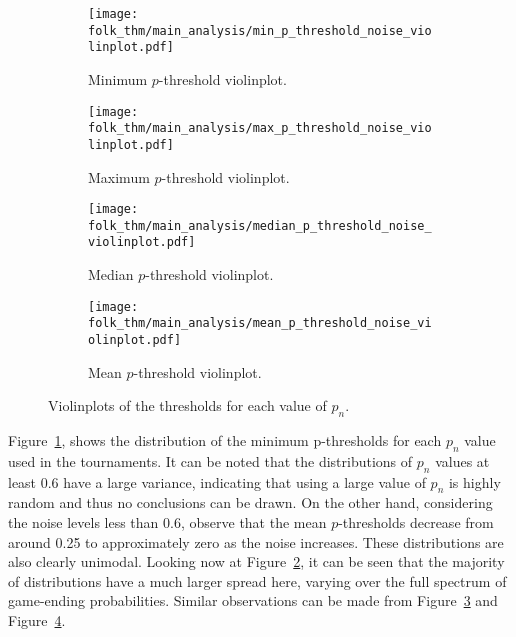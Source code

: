 \begin{figure}
    \centering
    \begin{subfigure}{0.45\textwidth}
        \centering
        \texttt{[image: folk\_thm/main\_analysis/min\_p\_threshold\_noise\_violinplot.pdf]}
        \caption{Minimum \(p\)-threshold violinplot.}\label{subfig:min_thresh_noise_violinplot}
    \end{subfigure}
    \hspace{3pt}
    \begin{subfigure}{0.45\textwidth}
        \centering
        \texttt{[image: folk\_thm/main\_analysis/max\_p\_threshold\_noise\_violinplot.pdf]}
        \caption{Maximum \(p\)-threshold violinplot.}\label{subfig:max_thresh_noise_violinplot}
    \end{subfigure}

    \vspace{5pt}

    \begin{subfigure}{0.45\textwidth}
        \centering
        \texttt{[image: folk\_thm/main\_analysis/median\_p\_threshold\_noise\_violinplot.pdf]}
        \caption{Median \(p\)-threshold violinplot.}\label{subfig:median_thresh_noise_violinplot}
    \end{subfigure}
    \hspace{3pt}
    \begin{subfigure}{0.45\textwidth}
        \centering
        \texttt{[image: folk\_thm/main\_analysis/mean\_p\_threshold\_noise\_violinplot.pdf]}
        \caption{Mean \(p\)-threshold violinplot.}\label{subfig:mean_thresh_noise_violinplot}
    \end{subfigure}
    \caption{Violinplots of the thresholds for each value of \(p_{n}\).}\label{fig:noise_p_thresh_violinplot}
\end{figure}

Figure~\ref{subfig:min_thresh_noise_violinplot}, shows the distribution of the
minimum p-thresholds for each \(p_{n}\) value used in the
tournaments. It can be noted that the distributions of \(p_{n}\) values at
least 0.6 have a large variance, indicating that using a large value of
\(p_{n}\) is highly random and thus no conclusions can be drawn. On the
other hand, considering the noise levels less than 0.6, observe that the mean
\(p\)-thresholds decrease from around 0.25 to approximately zero as the noise
increases. These distributions are also clearly unimodal. Looking now at Figure~\ref{subfig:max_thresh_noise_violinplot}, it can be seen that the
majority of distributions have a much larger spread here, varying over the full
spectrum of game-ending probabilities. Similar observations can be made from Figure~\ref{subfig:median_thresh_noise_violinplot}
and Figure~\ref{subfig:mean_thresh_noise_violinplot}. 

